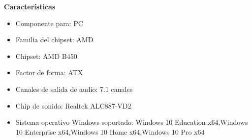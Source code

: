 \documentclass{article}
\begin{document}
    \textbf{Características}
    \begin{itemize}
      \item Componente para: PC
      \item Familia del chipset: AMD
      \item Chipset: AMD B450
      \item Factor de forma: ATX
      \item Canales de salida de audio: 7.1 canales
      \item Chip de sonido: Realtek ALC887-VD2
      \item Sistema operativo Windows soportado: Windows 10 Education x64,Windows 10 Enterprise x64,Windows 10 Home x64,Windows 10 Pro x64
    \end{itemize}
\end{document}
